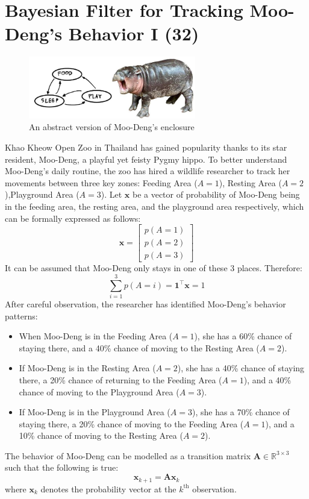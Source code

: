\section{ Bayesian Filter for Tracking Moo-Deng's Behavior I (32)}

\begin{figure}[H]
    \centering
    \includegraphics[width=0.65\textwidth]{img/moodeng.jpg}
    \caption{An abstract version of Moo-Deng's enclosure}
    \label{fig:p3c1}
\end{figure}

Khao Kheow Open Zoo in Thailand has gained popularity thanks to its star resident, Moo-Deng, a playful yet feisty Pygmy hippo. To better understand Moo-Deng's daily routine, the zoo has hired a wildlife researcher to track her movements between three key zones: Feeding Area ($A=1$), Resting Area ($A=2$),Playground Area ($A=3$).
Let $\mathbf{x}$ be a vector of probability of Moo-Deng being in the feeding area, the resting area, and the playground area respectively, which can be formally expressed as follows:
\begin{equation*}
    \mathbf{x}=\begin{bmatrix}
    p(A=1) \\ p(A=2) \\ 
    p(A=3)   
    \end{bmatrix}
\end{equation*}
It can be assumed that Moo-Deng only stays in one of these 3 places. Therefore:
\begin{equation*}
\sum_{i=1}^3p(A=i)=\mathbf{1}^\top\mathbf{x}=1
\end{equation*}
After careful observation, the researcher has identified Moo-Deng's behavior patterns:
\begin{itemize}
    \item When Moo-Deng is in the Feeding Area ($A=1$), she has a 60\% chance of staying there, and  a 40\% chance of moving to the Resting Area ($A=2$).
    \item If Moo-Deng is in the Resting Area ($A=2$), she has a 40\% chance of staying there, a 20\% chance of returning to the Feeding Area ($A=1$), and a 40\% chance of moving to the Playground Area ($A=3$).
    \item If Moo-Deng is in the Playground Area ($A=3$), she has a 70\% chance of staying there, a 20\% chance of moving to the Feeding Area ($A=1$), and a 10\% chance of moving to the Resting Area ($A=2$).
\end{itemize}
The behavior of Moo-Deng can be modelled as a transition matrix $\mathbf{A}\in\mathbb{R}^{3\times3}$ such that the following is true:
\begin{equation*}  \mathbf{x}_{k+1}=\mathbf{A}\mathbf{x}_{k}
\end{equation*}
where $\mathbf{x}_k$ denotes the probability vector at the $k^\text{th}$ observation.

